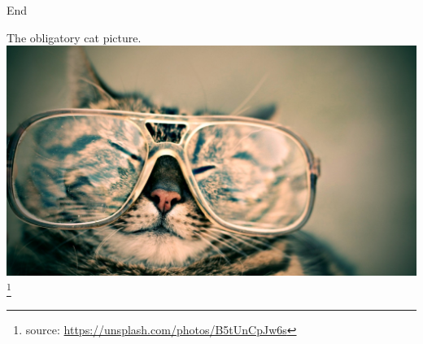 \part{} %
\begin{frame}{End}
  \begin{center}
    The obligatory cat picture.\\
    \includegraphics[height=.7\textheight]{images/octavio-fossatti-37556.eps}
    \footnote[frame]{source:
    \href{https://unsplash.com/photos/B5tUnCpJw6s}
    {https://unsplash.com/photos/B5tUnCpJw6s}}
  \end{center}
\end{frame}


\appendix
